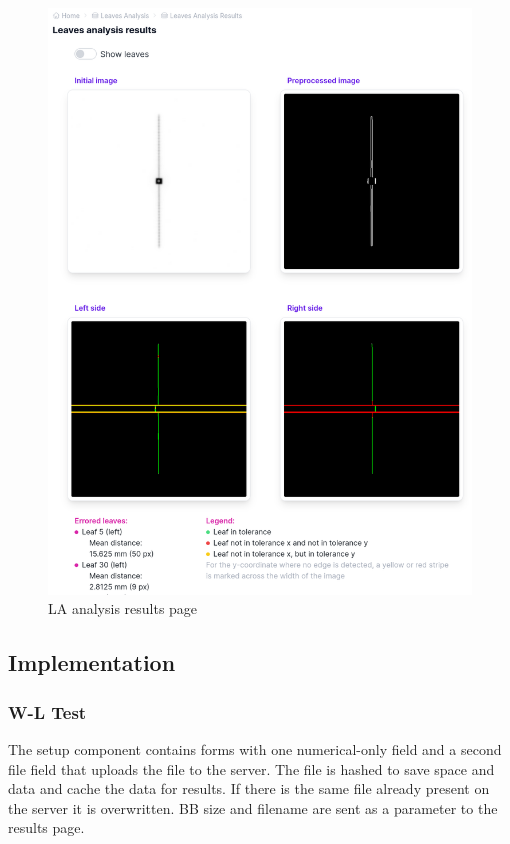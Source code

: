 \begin{figure}
    \centering
    \includegraphics[width=1\textwidth]{Content/Images/ui_la_results_page.png}
    \caption{LA analysis results page}
    \label{fig:uiLAResults}
\end{figure}

\subsection{Implementation}

\subsubsection{W-L Test}

The setup component contains forms with one numerical-only field and a second file field that uploads the file to the server. The file is hashed to save space and data and cache the data for results. If there is the same file already present on the server it is overwritten. BB size and filename are sent as a parameter to the results page.

